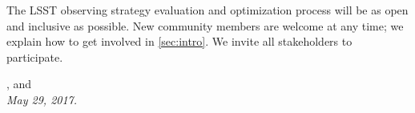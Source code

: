 \noindent The LSST observing strategy evaluation and optimization
process will be as open and inclusive as possible. New community members
are welcome at any time; we explain how to get involved in \autoref{sec:intro}.  We invite all stakeholders to participate.

\vspace{2\baselineskip}

{\raggedleft {},  and  \\
 \medskip \hspace{0.8\linewidth} \it May 29, 2017.}

\clearpage
